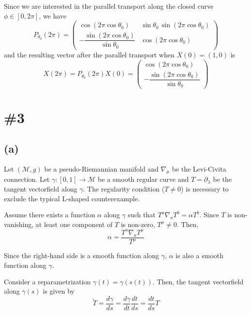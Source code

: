 \documentclass[a4paper,11pt]{article}
\begin{document}
Since we are interested in the parallel transport along the closed curve $\phi\in[0,2\pi]$, we have
\begin{equation}
    P_{\theta_0}(2\pi) = \begin{pmatrix}
        \cos(2\pi\cos\theta_0) & \sin\theta_0\,\sin(2\pi\cos\theta_0)\\
        -\dfrac{\sin(2\pi\cos\theta_0)}{\sin\theta_0} & \cos(2\pi\cos\theta_0)
    \end{pmatrix}
\end{equation}
and the resulting vector after the parallel transport when $X(0)=(1, 0)$ is 
\begin{equation}
    X(2\pi) = P_{\theta_0}(2\pi)X(0) = \begin{pmatrix}
        \cos(2\pi\cos\theta_0)\\
        -\dfrac{\sin(2\pi\cos\theta_0)}{\sin\theta_0}
    \end{pmatrix}
\end{equation}


\section{\#3}


\subsection{(a)}

Let $(\mathcal{M}, g)$ be a pseudo-Riemannian manifold and $\nabla_\mu$ be the Levi-Civita connection. Let $\gamma:[0, 1]\to\mathcal{M}$ be a smooth regular curve and $T=\partial_\lambda$ be the tangent vectorfield along $\gamma$. The regularity condition ($T\ne 0$) is necessary to exclude the typical L-shaped counterexample. 

Assume there exists a function $\alpha$ along $\gamma$ such that $T^a\nabla_a T^b = \alpha T^b$. Since $T$ is non-vanishing, at least one component of $T$ is non-zero, $T^\mu\ne 0$. Then,
\begin{equation}
    \alpha = \frac{T^a\nabla_a T^\mu}{T^\mu} 
\end{equation}

Since the right-hand side is a smooth function along $\gamma$, $\alpha$ is also a smooth function along $\gamma$.

Consider a reparametrization $\gamma(t)=\gamma(s(t))$. Then, the tangent vectorfield along $\gamma(s)$ is given by
\begin{equation}
    \widetilde{T} = \frac{d\gamma}{ds} = \frac{d\gamma}{dt}\frac{dt}{ds} = \frac{dt}{ds} T
\end{equation}
\end{document}
